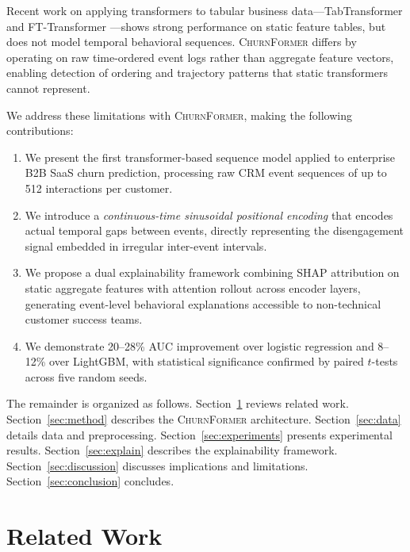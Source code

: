 \documentclass[review, 12pt]{elsarticle}
\newcommand{\model}{\textsc{ChurnFormer}}
\begin{document}
Recent work on applying transformers to tabular business data---TabTransformer
\cite{huang2020tabtransformer} and FT-Transformer \cite{gorishniy2021}---shows
strong performance on static feature tables, but does not model temporal
behavioral sequences.
\model{} differs by operating on raw time-ordered event logs rather than
aggregate feature vectors, enabling detection of ordering and trajectory
patterns that static transformers cannot represent.

We address these limitations with \model{}, making the following contributions:

\begin{enumerate}[label=(\arabic*), leftmargin=2.5em]
  \item We present the first transformer-based sequence model applied to
    enterprise B2B SaaS churn prediction, processing raw CRM event sequences
    of up to 512 interactions per customer.

  \item We introduce a \emph{continuous-time sinusoidal positional encoding}
    that encodes actual temporal gaps between events, directly representing the
    disengagement signal embedded in irregular inter-event intervals.

  \item We propose a dual explainability framework combining SHAP attribution
    on static aggregate features with attention rollout \cite{abnar2020} across
    encoder layers, generating event-level behavioral explanations accessible to
    non-technical customer success teams.

  \item We demonstrate 20--28\% AUC improvement over logistic regression and
    8--12\% over LightGBM, with statistical significance confirmed by paired
    $t$-tests across five random seeds.
\end{enumerate}

The remainder is organized as follows.
Section~\ref{sec:related} reviews related work.
Section~\ref{sec:method} describes the \model{} architecture.
Section~\ref{sec:data} details data and preprocessing.
Section~\ref{sec:experiments} presents experimental results.
Section~\ref{sec:explain} describes the explainability framework.
Section~\ref{sec:discussion} discusses implications and limitations.
Section~\ref{sec:conclusion} concludes.

\section{Related Work}
\label{sec:related}
\end{document}
